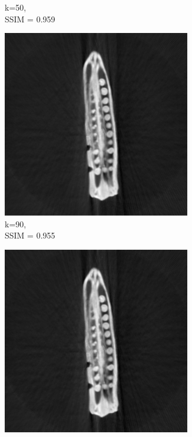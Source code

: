 \documentclass[journal]{IEEEtran}
\begin{document}
\begin{figure}[h]
\begin{subfigure}[b]{0.24\linewidth}
        \caption{k=50,\\ SSIM = 0.959}
     \end{subfigure} 
  \begin{subfigure}[b]{0.24\linewidth}
        \includegraphics[width=\textwidth]{../images/okra/2D_okra/weighted_pca90.png}
        \caption{k=90,\\ SSIM = 0.955}
     \end{subfigure}
  \begin{subfigure}[b]{0.24\linewidth}
        \includegraphics[width=\textwidth]{../images/okra/2D_okra/weighted_pca130.png}

\end{subfigure}
\end{figure}
\end{document}

